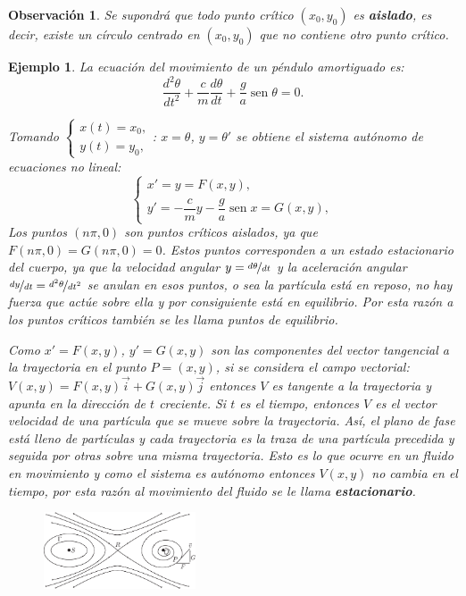 \documentclass[a5paper,doc,10pt,noapacite]{apa6}
\DeclareMathOperator{\sen}{sen}
\newtheorem{observ}{Observación}
\newtheorem{ejem}{Ejemplo}
\begin{document}
{{\begin{observ}
	Se supondrá que todo punto crítico \((x_0,y_0)\) es \emph{\textbf{aislado}}, es decir, existe un círculo centrado en \((x_0,y_0)\)  que no contiene otro punto crítico.
\end{observ}

\begin{ejem}
	La ecuación del movimiento de un péndulo amortiguado es:
	\[
	\dfrac{d^2\theta}{dt^2}+\dfrac{c}{m}\dfrac{d\theta}{dt}+\dfrac{g}{a}\sen\theta=0.
	\]
	
	Tomando \(
			\begin{cases}
			x(t) = x_0,
			 \\
			y(t) = y_0,
			\end{cases}
		\)\hspace{-1em}: \(x=\theta\), \(y=\theta'\) se obtiene el sistema autónomo de ecuaciones no lineal:
	\[
		\begin{cases}
			x' = y = F(x,y),
			 \\
			y' = -\dfrac{c}{m}y-\dfrac{g}{a}\sen x=G(x,y),
			\end{cases}
	\]
	Los puntos \((n\pi,0)\) son puntos críticos aislados, ya que  \(F(n\pi,0)=G(n\pi,0)=0\). Estos puntos corresponden a un estado estacionario del cuerpo, ya que la velocidad angular \(y=\nicefrac{d\theta}{dt}\) y la aceleración angular \(\nicefrac{dy}{dt}=\nicefrac{d^2\theta}{dt^2}\)  se anulan en esos puntos, o sea la partícula está en reposo, no hay fuerza que actúe sobre ella y por consiguiente está en equilibrio. Por esta razón a los puntos críticos también se les llama puntos de equilibrio.

	Como \(x'=F(x,y)\), \(y'=G(x,y)\) son las componentes del vector tangencial a la trayectoria en el punto \(P=(x,y)\), si se considera el campo vectorial: \(V(x,y)=F(x,y)\vec{i}+G(x,y)\vec{j}\) entonces \(V\) es tangente a la trayectoria y apunta en la dirección de \(t\) creciente. Si \(t\) es el tiempo, entonces \(V\) es el vector velocidad de una partícula que se mueve sobre la trayectoria. Así, el plano de fase está lleno de partículas y cada trayectoria es la traza de una partícula precedida y seguida por otras sobre una misma trayectoria. Esto es lo que ocurre en un fluido en movimiento y como el sistema es autónomo entonces \(V(x,y)\) no cambia en el tiempo, por esta razón al movimiento del fluido se le llama \emph{\textbf{estacionario}}.

	\begin{figure}[H]
		\captionsetup{justification=centering, labelfont=footnotesize, font=footnotesize}
		\centering
		\includegraphics[width=4.5cm]{Graficos/figura1}
		\caption{ }
		\label{fig:M-1}
	\end{figure}


\end{ejem}}}
\end{document}
